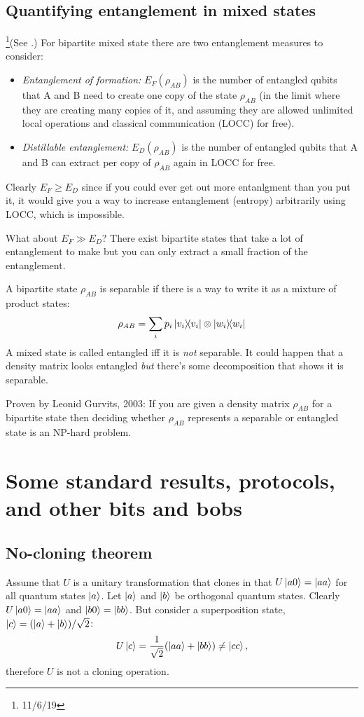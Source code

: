 \documentclass[12pt]{article}
\begin{document}
\subsection{Quantifying entanglement in mixed states}
\footnote{11/6/19}(See \cite[Lec. 11]{scaaronson}.) For
bipartite mixed state there are two entanglement measures to consider:
\begin{itemize}
    \item \emph{Entanglement of formation:} $E_F(\rho_{AB})$ is the
        number of entangled qubits that A and B need to create one copy of the
        state $\rho_{AB}$ (in the limit where they are creating many copies of
        it, and assuming they are allowed unlimited local operations and
        classical communication (LOCC) for free).
    \item \emph{Distillable entanglement:} $E_D(\rho_{AB})$ is the number of
        entangled qubits that A and B can extract per copy of $\rho_{AB}$ again
        in LOCC for free.
\end{itemize}
Clearly $E_F \geq E_D$ since if you could ever get out more entanlgment than
you put it, it would give you a way to increase entanglement (entropy)
arbitrarily using LOCC, which is impossible.

What about $E_F \gg E_D$? There exist bipartite states that take a lot of
entanglement to make but you can only extract a small fraction of the
entanglement.

A bipartite state $\rho_{AB}$ is separable if there is a way to write it as a
mixture of product states:
\[\rho_{AB} = \sum_ip_i\ketbra{v_i}\otimes\ketbra{w_i}\]
A mixed state is called entangled iff it is \emph{not} separable. It could
happen that a density matrix looks entangled \emph{but} there's some
decomposition that shows it is separable.

Proven by Leonid Gurvits, 2003: If you are given a density matrix $\rho_{AB}$
for a bipartite state then deciding whether $\rho_{AB}$ represents a separable
or entangled state is an NP-hard problem.


\section{Some standard results, protocols, and other bits and bobs}
\subsection{No-cloning theorem}
Assume that $U$ is a unitary transformation that clones in that $U\ket{a0} =
\ket{aa}$ for all quantum states $\ket{a}$. Let $\ket{a}$ and $\ket{b}$ be
orthogonal quantum states. Clearly $U\ket{a0} = \ket{aa}$ and $\ket{b0} =
\ket{bb}$. But consider a superposition state, $\ket{c} = (\ket{a} +
\ket{b})/\sqrt{2}$:
\[U\ket{c} = \frac{1}{\sqrt{2}}(\ket{aa} + \ket{bb}) \neq \ket{cc},\]
therefore $U$ is not a cloning operation.
\end{document}
